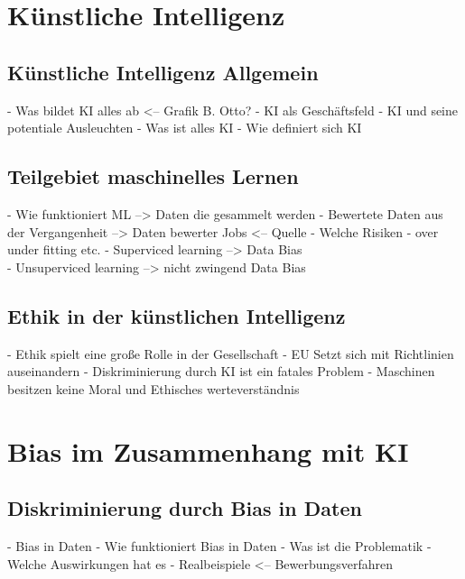 \begin{onehalfspace}
        \newpage
        \section{Künstliche Intelligenz}
        \label{subsec:KIandML}
        \subsection{Künstliche Intelligenz Allgemein}
        \label{subsubsec:KIAllgemein}
            - Was bildet KI alles ab <-- Grafik B. Otto?
            - KI als Geschäftsfeld 
            - KI und seine potentiale Ausleuchten 
            - Was ist alles KI
            - Wie definiert sich KI

            \cite{Cremers2019}
            \cite{Gröger2021}

        \subsection{Teilgebiet maschinelles Lernen}
        \label{subsubsec:teilgebietML}
            - Wie funktioniert ML --> Daten die gesammelt werden
            - Bewertete Daten aus der Vergangenheit --> Daten bewerter Jobs <-- Quelle
            - Welche Risiken - over under fitting etc.
            -   Superviced learning --> Data Bias\\
            -   Unsuperviced learning --> nicht zwingend Data Bias\\


        \subsection{Ethik in der künstlichen Intelligenz}
        \label{subsubsec:ethikinderKI}
            - Ethik spielt eine große Rolle in der Gesellschaft
            - EU Setzt sich mit Richtlinien auseinandern
            - Diskriminierung durch KI ist ein fatales Problem
            - Maschinen besitzen keine Moral und Ethisches werteverständnis


        \newpage
        \section{Bias im Zusammenhang mit \ac{KI}}
        \label{subsec:KIundbias}
        \subsection{Diskriminierung durch Bias in Daten}
        \label{subsubsec:diskriminierungdurchverzerrung}
            - Bias in Daten
            - Wie funktioniert Bias in Daten
            - Was ist die Problematik
            - Welche Auswirkungen hat es 
            - Realbeispiele <-- Bewerbungsverfahren


\end{onehalfspace}
